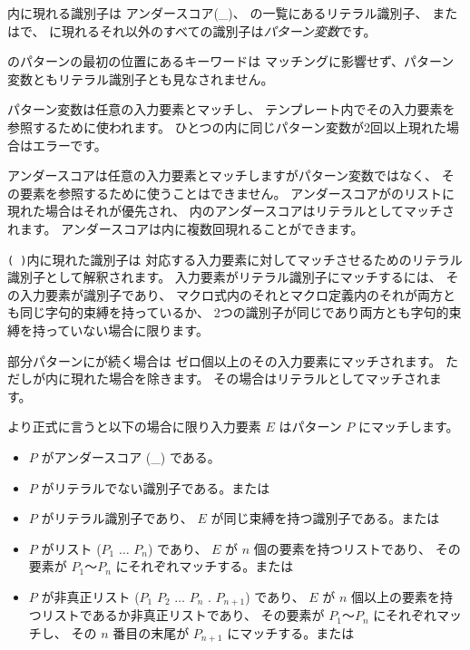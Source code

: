 \begin{entry}
内に現れる識別子は
アンダースコア({\cf \_})、
の一覧にあるリテラル識別子、
またはで、
に現れるそれ以外のすべての識別子は{\em パターン変数}です。

のパターンの最初の位置にあるキーワードは
マッチングに影響せず、パターン変数ともリテラル識別子とも見なされません。

パターン変数は任意の入力要素とマッチし、
テンプレート内でその入力要素を参照するために使われます。
ひとつの内に同じパターン変数が2回以上現れた場合はエラーです。

アンダースコアは任意の入力要素とマッチしますがパターン変数ではなく、
その要素を参照するために使うことはできません。
アンダースコアがのリストに現れた場合はそれが優先され、
内のアンダースコアはリテラルとしてマッチされます。
アンダースコアは内に複数回現れることができます。

\texttt{( \dotsfoo)}内に現れた識別子は
対応する入力要素に対してマッチさせるためのリテラル識別子として解釈されます。
入力要素がリテラル識別子にマッチするには、
その入力要素が識別子であり、
マクロ式内のそれとマクロ定義内のそれが両方とも同じ字句的束縛を持っているか、
2つの識別子が同じであり両方とも字句的束縛を持っていない場合に限ります。

部分パターンにが続く場合は
ゼロ個以上のその入力要素にマッチされます。
ただしが内に現れた場合を除きます。
その場合はリテラルとしてマッチされます。

より正式に言うと以下の場合に限り入力要素 $E$ はパターン $P$ にマッチします。

\begin{itemize}
\item $P$ がアンダースコア ({\cf \_}) である。

\item $P$ がリテラルでない識別子である。または

\item $P$ がリテラル識別子であり、 $E$ が同じ束縛を持つ識別子である。または

\item $P$ がリスト {\cf ($P_1$ $\dots$ $P_n$)} であり、 $E$ が $n$ 個の要素を持つリストであり、
      その要素が $P_1$〜$P_n$ にそれぞれマッチする。または

\item $P$ が非真正リスト
      {\cf ($P_1$ $P_2$ $\dots$ $P_n$ . $P_{n+1}$)}
      であり、 $E$ が $n$ 個以上の要素を持つリストであるか非真正リストであり、
      その要素が $P_1$〜$P_n$ にそれぞれマッチし、
      その $n$ 番目の末尾が $P_{n+1}$ にマッチする。または


\end{itemize}
\end{entry}
